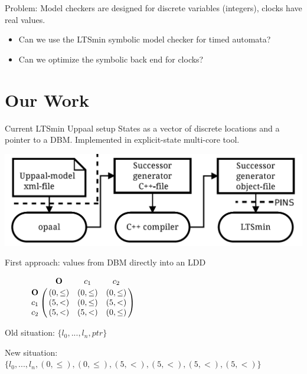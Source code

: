 \begin{frame}
Problem: Model checkers are designed for discrete variables (integers), clocks have real values.
\begin{itemize}
\item Can we use the LTSmin symbolic model checker for timed automata?
\item Can we optimize the symbolic back end for clocks?
\end{itemize}
\end{frame}

\section{Our Work}

\begin{frame}{Current LTSmin Uppaal setup}
States as a vector of discrete locations and a pointer to a DBM.
Implemented in explicit-state multi-core tool.

\includegraphics[width=\textwidth]{img/opaal}

First approach: values from DBM directly into an LDD
\end{frame}

\begin{frame}
\begin{figure}
	\centering
	\begin{math}
 \bordermatrix{ 		                 & \mathbf{O} & c_1           & c_2        \cr
 			\mathbf{O} &(0,\leq)      & (0,\leq)      & (0,\leq)     \cr
 			c_1        &(5,<)      & (0,\leq)      & (5,<)\cr
 			c_2        &(5,<)      & (5,<) & (0,\leq)     \cr}
	\end{math}
\end{figure}

Old situation: $\{l_0,...,l_n,ptr\}$

New situation: $\{l_0,...,l_n,(0,\leq),(0,\leq),(5,<),(5,<),(5,<),(5,<)\}$
\end{frame}

